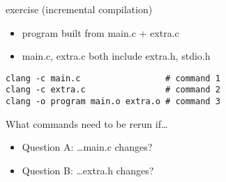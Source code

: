 \begin{frame}[fragile]{exercise (incremental compilation)}
\begin{itemize}
\item program built from main.c + extra.c
\item main.c, extra.c both include extra.h, stdio.h
\end{itemize}
\vspace{.5cm}
\begin{Verbatim}[fontsize=\small]
clang -c main.c                 # command 1
clang -c extra.c                # command 2
clang -o program main.o extra.o # command 3
\end{Verbatim}
What commands need to be rerun if\ldots
\vspace{.25cm}
\begin{itemize}
\item Question A: \ldots main.c changes?
\item Question B: \ldots extra.h changes?
\end{itemize}
\end{frame}

